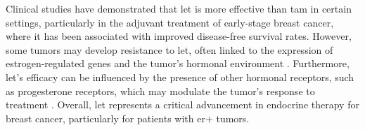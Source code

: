 Clinical studies have demonstrated that \gls{let} is more effective than
\gls{tam} in certain settings, particularly in the adjuvant treatment of
early-stage breast cancer, where it has been associated with improved
disease-free survival rates\supercite{jerusalem_continuous_2021}.
However, some tumors may develop resistance to \gls{let}, often linked to the
expression of estrogen-regulated genes and the tumor's hormonal environment
\supercite{lee_suppressed_2021}.
Furthermore, \gls{let}'s efficacy can be influenced by the presence of other
hormonal receptors, such as progesterone receptors, which may modulate the
tumor's response to treatment \supercite{lee_suppressed_2021}.
Overall, \gls{let} represents a critical advancement in endocrine therapy for
breast cancer, particularly for patients with \gls{er+} tumors.
